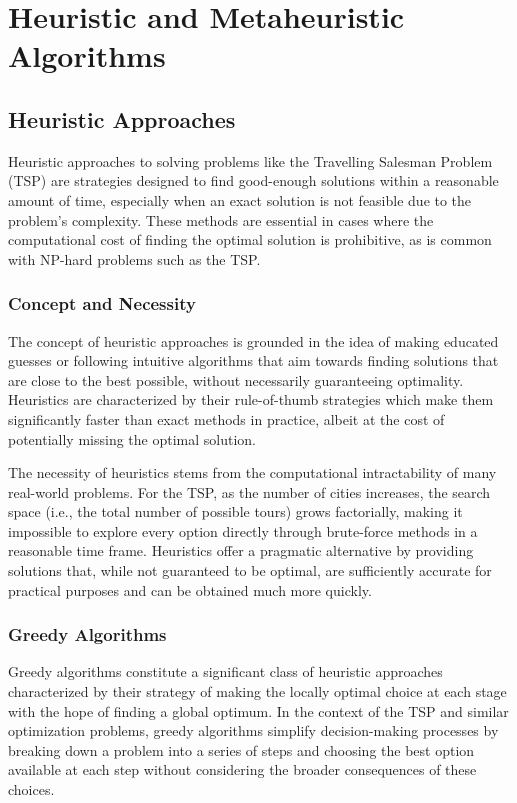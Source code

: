 \chapter{Heuristic and Metaheuristic Algorithms}\label{chapt:4}

\section{Heuristic Approaches}

Heuristic approaches to solving problems like the Travelling Salesman Problem (TSP) are strategies designed to find good-enough solutions within a reasonable amount of time, especially when an exact solution is not feasible due to the problem's complexity. These methods are essential in cases where the computational cost of finding the optimal solution is prohibitive, as is common with NP-hard problems such as the TSP.

\subsection{Concept and Necessity}
The concept of heuristic approaches is grounded in the idea of making educated guesses or following intuitive algorithms that aim towards finding solutions that are close to the best possible, without necessarily guaranteeing optimality. Heuristics are characterized by their rule-of-thumb strategies which make them significantly faster than exact methods in practice, albeit at the cost of potentially missing the optimal solution.

The necessity of heuristics stems from the computational intractability of many real-world problems. For the TSP, as the number of cities increases, the search space (i.e., the total number of possible tours) grows factorially, making it impossible to explore every option directly through brute-force methods in a reasonable time frame. Heuristics offer a pragmatic alternative by providing solutions that, while not guaranteed to be optimal, are sufficiently accurate for practical purposes and can be obtained much more quickly.


\subsection{Greedy Algorithms}

Greedy algorithms constitute a significant class of heuristic approaches characterized by their strategy of making the locally optimal choice at each stage with the hope of finding a global optimum. In the context of the TSP and similar optimization problems, greedy algorithms simplify decision-making processes by breaking down a problem into a series of steps and choosing the best option available at each step without considering the broader consequences of these choices.

